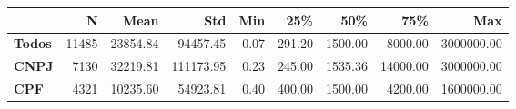 \begin{tabular}{lrrrrrrrr}
\toprule
{} &     N &     Mean &       Std &  Min &    25\% &     50\% &      75\% &        Max \\
\midrule
\textbf{Todos} & 11485 & 23854.84 &  94457.45 & 0.07 & 291.20 & 1500.00 &  8000.00 & 3000000.00 \\
\textbf{CNPJ } &  7130 & 32219.81 & 111173.95 & 0.23 & 245.00 & 1535.36 & 14000.00 & 3000000.00 \\
\textbf{CPF  } &  4321 & 10235.60 &  54923.81 & 0.40 & 400.00 & 1500.00 &  4200.00 & 1600000.00 \\
\bottomrule
\end{tabular}
